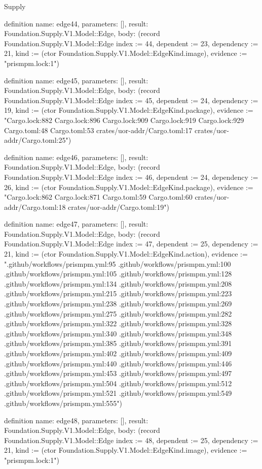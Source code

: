 \begin{lexlean}{Supply}
\begin{semanticmodule}
definition{
  name: edge44,
  parameters: [],
  result: Foundation.Supply.V1.Model::Edge,
  body: (record Foundation.Supply.V1.Model::Edge {index := 44, dependent := 23, dependency := 21, kind := (ctor Foundation.Supply.V1.Model::EdgeKind.image), evidence := "prismpm.lock:1"})
}

definition{
  name: edge45,
  parameters: [],
  result: Foundation.Supply.V1.Model::Edge,
  body: (record Foundation.Supply.V1.Model::Edge {index := 45, dependent := 24, dependency := 19, kind := (ctor Foundation.Supply.V1.Model::EdgeKind.package), evidence := "Cargo.lock:882 Cargo.lock:896 Cargo.lock:909 Cargo.lock:919 Cargo.lock:929 Cargo.toml:48 Cargo.toml:53 crates/uor-addr/Cargo.toml:17 crates/uor-addr/Cargo.toml:25"})
}

definition{
  name: edge46,
  parameters: [],
  result: Foundation.Supply.V1.Model::Edge,
  body: (record Foundation.Supply.V1.Model::Edge {index := 46, dependent := 24, dependency := 26, kind := (ctor Foundation.Supply.V1.Model::EdgeKind.package), evidence := "Cargo.lock:862 Cargo.lock:871 Cargo.toml:59 Cargo.toml:60 crates/uor-addr/Cargo.toml:18 crates/uor-addr/Cargo.toml:19"})
}

definition{
  name: edge47,
  parameters: [],
  result: Foundation.Supply.V1.Model::Edge,
  body: (record Foundation.Supply.V1.Model::Edge {index := 47, dependent := 25, dependency := 21, kind := (ctor Foundation.Supply.V1.Model::EdgeKind.action), evidence := ".github/workflows/prismpm.yml:95 .github/workflows/prismpm.yml:100 .github/workflows/prismpm.yml:105 .github/workflows/prismpm.yml:128 .github/workflows/prismpm.yml:134 .github/workflows/prismpm.yml:208 .github/workflows/prismpm.yml:215 .github/workflows/prismpm.yml:223 .github/workflows/prismpm.yml:238 .github/workflows/prismpm.yml:269 .github/workflows/prismpm.yml:275 .github/workflows/prismpm.yml:282 .github/workflows/prismpm.yml:322 .github/workflows/prismpm.yml:328 .github/workflows/prismpm.yml:340 .github/workflows/prismpm.yml:348 .github/workflows/prismpm.yml:385 .github/workflows/prismpm.yml:391 .github/workflows/prismpm.yml:402 .github/workflows/prismpm.yml:409 .github/workflows/prismpm.yml:440 .github/workflows/prismpm.yml:446 .github/workflows/prismpm.yml:453 .github/workflows/prismpm.yml:497 .github/workflows/prismpm.yml:504 .github/workflows/prismpm.yml:512 .github/workflows/prismpm.yml:521 .github/workflows/prismpm.yml:549 .github/workflows/prismpm.yml:555"})
}

definition{
  name: edge48,
  parameters: [],
  result: Foundation.Supply.V1.Model::Edge,
  body: (record Foundation.Supply.V1.Model::Edge {index := 48, dependent := 25, dependency := 21, kind := (ctor Foundation.Supply.V1.Model::EdgeKind.image), evidence := "prismpm.lock:1"})
}


\end{semanticmodule}
\end{lexlean}
